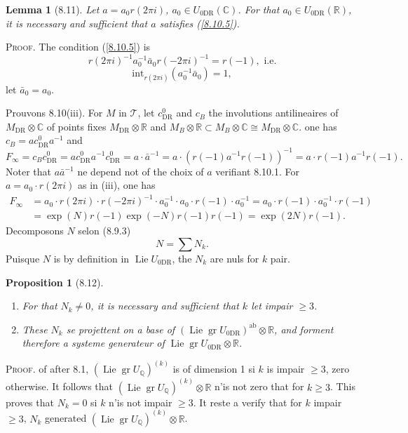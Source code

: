\documentclass[12pt,a4paper]{article}
\theoremstyle{plain}
\newtheorem{lemma}[theorem]{Lemma}
\newtheorem{proposition}[theorem]{Proposition}
\theoremstyle{definition}
\theoremstyle{remark}
\DeclareMathOperator{\Lie}{Lie}
\DeclareMathOperator{\gr}{gr}
\newcommand{\Q}{\mathbb{Q}}
\newcommand{\C}{\mathbb{C}}
\newcommand{\R}{\mathbb{R}}
\newcommand{\DR}{\mathrm{DR}}
\begin{document}
\begin{lemma}[8.11]
Let $a = a_0 r(2\pi i)$, $a_0 \in U_{0\DR}(\C)$. For that $a_0 \in U_{0\DR}(\R)$, it is necessary and sufficient that $a$ satisfies (\ref{8.10.5}).
\end{lemma}

\textsc{Proof.} The condition (\ref{8.10.5}) is
$$r(2\pi i)^{-1} a_0^{-1} \bar{a}_0 r(-2\pi i)^{-1} = r(-1), \text{ i.e.}$$
$$\mathrm{int}_{r(2\pi i)}(a_0^{-1}\bar{a}_0) = 1,$$
let $\bar{a}_0 = a_0$.

Prouvons 8.10(iii). For $M$ in $\mathcal{T}$, let $c_{\DR}^0$ and $c_B$ the involutions antilineaires of $M_{\DR} \otimes \C$ of points fixes $M_{\DR} \otimes \R$ and $M_B \otimes \R \subset M_B \otimes \C \cong M_{\DR} \otimes \C$. one has $c_B = a c_{\DR}^0 a^{-1}$ and
$$F_\infty = c_B c_{\DR}^0 = a c_{\DR}^0 a^{-1} c_{\DR}^0 = a \cdot \bar{a}^{-1} = a \cdot (r(-1)a^{-1}r(-1))^{-1} = a \cdot r(-1) a^{-1} r(-1).$$
Noter that $a\bar{a}^{-1}$ ne depend not of the choix of $a$ verifiant 8.10.1. For $a = a_0 \cdot r(2\pi i)$ as in (iii), one has
\begin{align*}
F_\infty &= a_0 \cdot r(2\pi i) \cdot r(-2\pi i)^{-1} \cdot a_0^{-1} \cdot a_0 \cdot r(-1) \cdot a_0^{-1} = a_0 \cdot r(-1) \cdot a_0^{-1} \cdot r(-1) \\
&= \exp(N)r(-1)\exp(-N)r(-1)r(-1) = \exp(2N)r(-1).
\end{align*}
Decomposons $N$ selon (8.9.3)
$$N = \sum N_k.$$
Puisque $N$ is by definition in $\Lie U_{0\DR}$, the $N_k$ are nuls for $k$ pair.

\begin{proposition}[8.12]
\leavevmode
\begin{enumerate}[label=(\roman*)]
\item For that $N_k \neq 0$, it is necessary and sufficient that $k$ let impair $\geq 3$.
\item These $N_k$ se projettent on a base of $(\Lie \gr U_{0\DR})^{\mathrm{ab}} \otimes \R$, and forment therefore a systeme generateur of $\Lie \gr U_{0\DR} \otimes \R$.
\end{enumerate}
\end{proposition}

\textsc{Proof.} of after 8.1, $(\Lie \gr U_\Q)^{(k)}$ is of dimension 1 si $k$ is impair $\geq 3$, zero otherwise. It follows that $(\Lie \gr U_\Q)^{(k)} \otimes \R$ n'is not zero that for $k \geq 3$. This proves that $N_k = 0$ si $k$ n'is not impair $\geq 3$. It reste a verify that for $k$ impair $\geq 3$, $N_k$ generated $(\Lie \gr U_\Q)^{(k)} \otimes \R$.
\end{document}
